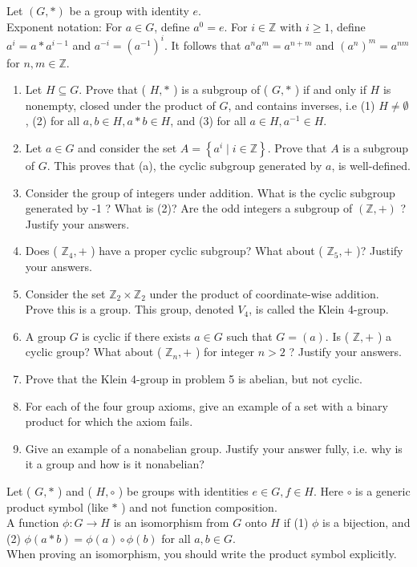 \newpage


Let $(G, *)$ be a group with identity $e$.\\
Exponent notation: For $a \in G$, define $a^{0}=e$. For $i \in \mathbb{Z}$ with $i \geq 1$, define $a^{i}=a * a^{i-1}$ and $a^{-i}=\left(a^{-1}\right)^{i}$. It follows that $a^{n} a^{m}=a^{n+m}$ and $\left(a^{n}\right)^{m}=a^{n m}$ for $n, m \in \mathbb{Z}$.

\begin{enumerate}
  \item Let $H \subseteq G$. Prove that ( $H, *$ ) is a subgroup of ( $G, *$ ) if and only if $H$ is nonempty, closed under the product of $G$, and contains inverses, i.e (1) $H \neq \emptyset$, (2) for all $a, b \in H, a * b \in H$, and (3) for all $a \in H, a^{-1} \in H$.
  \item Let $a \in G$ and consider the set $A=\left\{a^{i} \mid i \in \mathbb{Z}\right\}$. Prove that $A$ is a subgroup of $G$. This proves that (a), the cyclic subgroup generated by $a$, is well-defined.
  \item Consider the group of integers under addition. What is the cyclic subgroup generated by -1 ? What is (2)? Are the odd integers a subgroup of $(\mathbb{Z},+)$ ? Justify your answers.
  \item Does ( $\mathbb{Z}_{4},+$ ) have a proper cyclic subgroup? What about ( $\mathbb{Z}_{5},+$ )? Justify your answers.
  \item Consider the set $\mathbb{Z}_{2} \times \mathbb{Z}_{2}$ under the product of coordinate-wise addition. Prove this is a group. This group, denoted $V_{4}$, is called the Klein 4-group.
  \item A group $G$ is cyclic if there exists $a \in G$ such that $G=(a)$. Is ( $\mathbb{Z},+$ ) a cyclic group? What about ( $\mathbb{Z}_{n},+$ ) for integer $n>2$ ? Justify your answers.
  \item Prove that the Klein 4-group in problem 5 is abelian, but not cyclic.
  \item For each of the four group axioms, give an example of a set with a binary product for which the axiom fails.
  \item Give an example of a nonabelian group. Justify your answer fully, i.e. why is it a group and how is it nonabelian?
\end{enumerate}


\newpage


Let ( $G, *$ ) and ( $H, \circ$ ) be groups with identities $e \in G, f \in H$. Here $\circ$ is a generic product symbol (like $*$ ) and not function composition.\\
A function $\phi: G \rightarrow H$ is an isomorphism from $G$ onto $H$ if (1) $\phi$ is a bijection, and (2) $\phi(a * b)= \phi(a) \circ \phi(b)$ for all $a, b \in G$.\\
When proving an isomorphism, you should write the product symbol explicitly.

